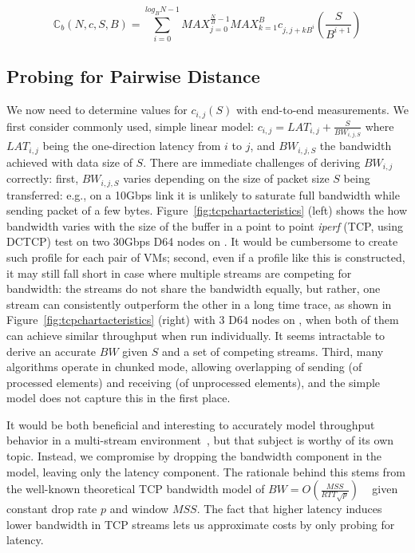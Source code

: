 $$\mathbb{C}_{b}(N, c, S, B) = \sum_{i=0}^{log_BN-1}MAX_{j=0}^{\frac{N}{B}-1}MAX_{k=1}^{B}c_{j,j+kB^i}(\frac{S}{B^{i+1}}) $$

\subsection{Probing for Pairwise Distance}
We now need to determine values for $c_{i,j}(S)$ with end-to-end measurements. We first consider commonly used, simple linear model: $c_{i,j} = LAT_{i,j} + \frac{S}{BW_{i,j,S}}$ where $LAT_{i,j}$ being the one-direction latency from $i$ to $j$, and $BW_{i,j,S}$ the bandwidth achieved with data size of $S$. There are immediate challenges of deriving $BW_{i,j}$ correctly: first, $BW_{i,j,S}$ varies depending on the size of packet size $S$ being transferred: e.g., on a 10Gbps link it is unlikely to saturate full bandwidth while sending packet of a few bytes. Figure~\ref{fig:tcpchartacteristics} (left) shows the how bandwidth varies with the size of the buffer in a point to point \textit{iperf} (TCP, using DCTCP) test on two 30Gbps D64 nodes on \azure. It would be cumbersome to create such profile for each pair of VMs; second, even if a profile like this is constructed, it may still fall short in case where multiple streams are competing for bandwidth: the streams do not share the bandwidth equally, but rather, one stream can consistently outperform the other in a long time trace, as shown in Figure~\ref{fig:tcpchartacteristics} (right) with 3 D64 nodes on \azure, when both of them can achieve similar throughput when run individually. It seems intractable to derive an accurate $BW$ given $S$ and a set of competing streams. Third, many \collectives algorithms operate in chunked mode, allowing overlapping of sending (of processed elements) and receiving (of unprocessed elements), and the simple model does not capture this in the first place.

It would be both beneficial and interesting to accurately model throughput behavior in a multi-stream environment~\cite{data-center-tcp-dctcp,tcphsfairness,10.1007/978-3-540-72606-7_86,ha2008cubic}, but that subject is worthy of its own topic. Instead, we compromise by dropping the bandwidth component in the model, leaving only the latency component. The rationale behind this stems from the well-known theoretical TCP bandwidth model of $BW=O(\frac{MSS}{RTT\sqrt{p}})$ ~\cite{mathis1997macroscopic} given constant drop rate $p$ and window $MSS$. The fact that higher latency induces lower bandwidth in TCP streams lets us approximate costs by only probing for latency.

